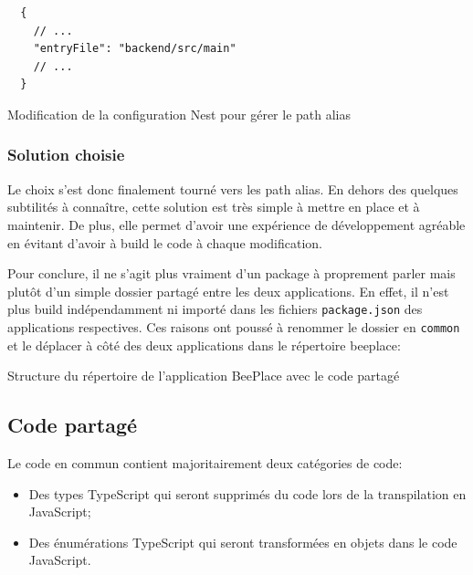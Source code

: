 \begin{listing}[H]
  \begin{verbatim}
  {
    // ...
    "entryFile": "backend/src/main"
    // ...
  }
\end{verbatim}
  \caption{Modification de la configuration Nest pour gérer le path alias}
  \label{listing:nest-entry-file}
\end{listing}

\subsubsection{Solution choisie}

Le choix s'est donc finalement tourné vers les path alias. En dehors des quelques subtilités à connaître, cette solution est très simple à mettre en place et à maintenir. De plus, elle permet d'avoir une expérience de développement agréable en évitant d'avoir à build le code à chaque modification.

Pour conclure, il ne s'agit plus vraiment d'un package à proprement parler mais plutôt d'un simple dossier partagé entre les deux applications. En effet, il n'est plus build indépendamment ni importé dans les fichiers \texttt{package.json} des applications respectives. Ces raisons ont poussé à renommer le dossier en \texttt{common} et le déplacer à côté des deux applications dans le répertoire beeplace:

\begin{listing}[H]
  \begin{tcolorbox}[arc=0mm,colback=white!5!white]
  \end{tcolorbox}
  \caption{Structure du répertoire de l'application BeePlace avec le code partagé}
  \label{listing:beeplace-repo-structure-v2}
\end{listing}

\subsection{Code partagé}

Le code en commun contient majoritairement deux catégories de code:

\begin{itemize}
  \item Des types TypeScript qui seront supprimés du code lors de la transpilation en JavaScript;
  \item Des énumérations TypeScript qui seront transformées en objets dans le code JavaScript.
\end{itemize}

